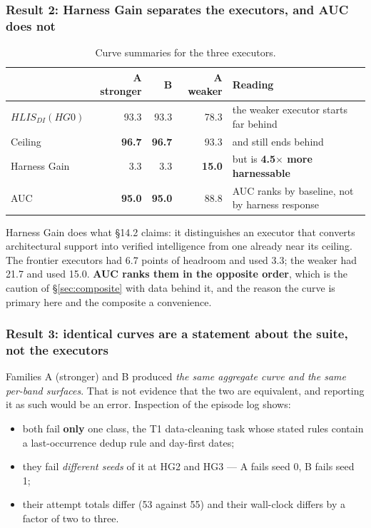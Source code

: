 \subsubsection{Result 2: Harness Gain separates the executors, and AUC does not}

\begin{table}[!htbp]
\centering\small
\begin{tabularx}{\textwidth}{@{}lrrrY@{}}
\toprule
& A stronger & B & A weaker & Reading \\
\midrule
$HLIS_{DI}(HG0)$ & 93.3 & 93.3 & 78.3 & the weaker executor starts far behind \\
Ceiling & \textbf{96.7} & \textbf{96.7} & 93.3 & and still ends behind \\
Harness Gain & 3.3 & 3.3 & \textbf{15.0} & but is \textbf{4.5$\times$ more harnessable} \\
AUC & \textbf{95.0} & \textbf{95.0} & 88.8 & AUC ranks by baseline, not by harness response \\
\bottomrule
\end{tabularx}
\caption{Curve summaries for the three executors.}
\label{tab:curvesummary}
\end{table}

Harness Gain does what \S14.2 claims: it distinguishes an executor that converts architectural support into verified intelligence from one already near its ceiling. The frontier executors had 6.7 points of headroom and used 3.3; the weaker had 21.7 and used 15.0. \textbf{AUC ranks them in the opposite order}, which is the caution of \S\ref{sec:composite} with data behind it, and the reason the curve is primary here and the composite a convenience.

\subsubsection{Result 3: identical curves are a statement about the suite, not the executors}

Families A (stronger) and B produced \emph{the same aggregate curve and the same per-band surfaces}. That is not evidence that the two are equivalent, and reporting it as such would be an error. Inspection of the episode log shows:

\begin{itemize}
\item both fail \textbf{only} one class, the T1 data-cleaning task whose stated rules contain a last-occurrence dedup rule and day-first dates;
\item they fail \emph{different seeds} of it at HG2 and HG3 --- A fails seed 0, B fails seed 1;
\item their attempt totals differ (53 against 55) and their wall-clock differs by a factor of two to three.
\end{itemize}

